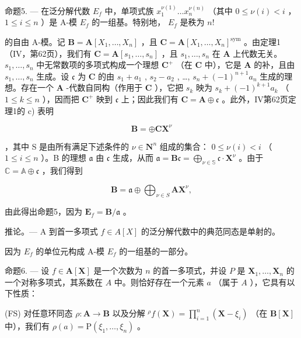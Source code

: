 命题5. --- 在泛分解代数 \(E_{f}\) 中，单项式族 \(x_{1}^{\nu(1)}\ldots x_{n}^{\nu(n)}\) （其中 \(0 \leqslant \nu(i) < i\) ， \(1 \leqslant i \leqslant n\) ）是 A-模 \(E_{f}\) 的一组基。特别地， \(E_{f}\) 是秩为 \(n!\)

的自由 A-模。记 \(\mathbf{B} = \mathbf{A}[X_1, \ldots, X_n]\) ，且 \(\mathbf{C} = \mathbf{A}[X_1, \ldots, X_n]^{\mathrm{sym}}\) 。由定理1（IV，第62页），我们有 \(\mathbf{C} = \mathbf{A}[s_1, \ldots, s_n]\) ，且 \(s_1, \ldots, s_n\) 在 \(\mathbf{A}\) 上代数无关。 \(s_1, \ldots, s_n\) 中无常数项的多项式构成一个理想 \(\mathbf{C}^+\) （在 \(\mathbf{C}\) 中），它是 \(\mathbf{A}\) 的补，且由 \(s_1, \ldots, s_n\) 生成。设 \(\mathfrak{c}\) 为 \(\mathbf{C}\) 的由 \(s_1 + a_1\) , \(s_2 - a_2\) , \ldots, \(s_n + (-1)^{n+1}a_n\) 生成的理想。存在一个 \(\mathbf{A}\) -代数自同构（作用于 \(\mathbf{C}\) ），它把 \(s_k\) 映为 \(s_k + (-1)^{k+1}a_k\) （ \(1 \leqslant k \leqslant n\) ），因而把 \(\mathbf{C}^+\) 映到 \(\mathfrak{c}\) 上；因此我们有 \(\mathbf{C} = \mathbf{A} \oplus \mathfrak{c}\) 。此外，IV第62页定理1的 c) 表明

\[
\mathbf {B} = \oplus \mathbf {C X} ^ {\nu}
\]

，其中 S 是由所有满足下述条件的 \(\nu \in \mathbf{N}^n\) 组成的集合： \(0 \leqslant \nu(i) < i\) （ \(1 \leqslant i \leqslant n\) ）。B 的理想 \(\mathfrak{a}\) 由 \(\mathfrak{c}\) 生成，从而 \(\mathfrak{a} = \mathbf{B}\mathfrak{c} = \bigoplus_{\nu \in \mathbb{S}} \mathfrak{c} \cdot \mathbf{X}^\nu\) 。由于 \(\mathbb{C} = \mathbb{A} \oplus \mathfrak{c}\) ，我们得到

\[
\mathbf {B} = \mathfrak {a} \oplus \bigoplus_ {\nu \in S} \mathbf {A X} ^ {\nu},
\]

由此得出命题5，因为 \(\mathbf{E}_f = \mathbf{B} / \mathfrak{a}\) 。

推论。--- A 到首一多项式 \(f \in A[X]\) 的泛分解代数中的典范同态是单射的。

因为 \(E_{f}\) 的单位元构成 A-模 \(E_{f}\) 的一组基的一部分。

命题6. --- 设 \(f \in \mathbf{A}[\mathbf{X}]\) 是一个次数为 \(n\) 的首一多项式，并设 \(P\) 是 \(\mathbf{X}_1, \ldots, \mathbf{X}_n\) 的一个对称多项式，其系数在 \(A\) 中。则恰好存在一个元素 \(a\) （属于 \(A\) ），它具有以下性质：

(FS) 对任意环同态 \(\rho: \mathbf{A} \to \mathbf{B}\) 以及分解 \({}^{\rho} f(\mathbf{X}) = \prod_{i=1}^{n} (\mathbf{X} - \xi_i)\) （在 \(\mathbf{B}[\mathbf{X}]\) 中），我们有 \(\rho(a) = \mathrm{P}(\xi_1, \ldots, \xi_n)\) 。

